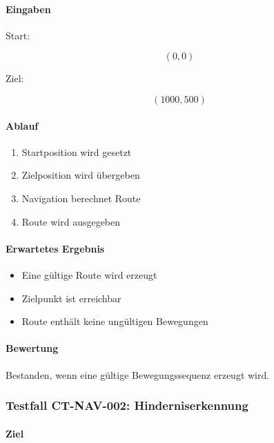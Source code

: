\paragraph{Eingaben}\label{eingaben-2}

Start:

\[
(0,0)
\]

Ziel:

\[
(1000,500)
\]

\paragraph{Ablauf}\label{ablauf-2}

\begin{enumerate}
\def\labelenumi{\arabic{enumi}.}
\tightlist
\item
  Startposition wird gesetzt
\item
  Zielposition wird übergeben
\item
  Navigation berechnet Route
\item
  Route wird ausgegeben
\end{enumerate}

\paragraph{Erwartetes Ergebnis}\label{erwartetes-ergebnis-2}

\begin{itemize}
\tightlist
\item
  Eine gültige Route wird erzeugt
\item
  Zielpunkt ist erreichbar
\item
  Route enthält keine ungültigen Bewegungen
\end{itemize}

\paragraph{Bewertung}\label{bewertung-2}

Bestanden, wenn eine gültige Bewegungssequenz erzeugt wird.

\subsubsection{Testfall CT-NAV-002:
Hinderniserkennung}\label{testfall-ct-nav-002-hinderniserkennung}

\paragraph{Ziel}\label{ziel-3}

